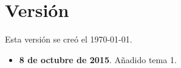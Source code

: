 \documentclass[{../apuntes.tex}]{subfiles}
\begin{document}
\chapter{Versión}

Esta versión se creó el \today.

\begin{itemize}
	\item \textbf{8 de octubre de 2015}. Añadido tema 1.
\end{itemize}
\end{document}
